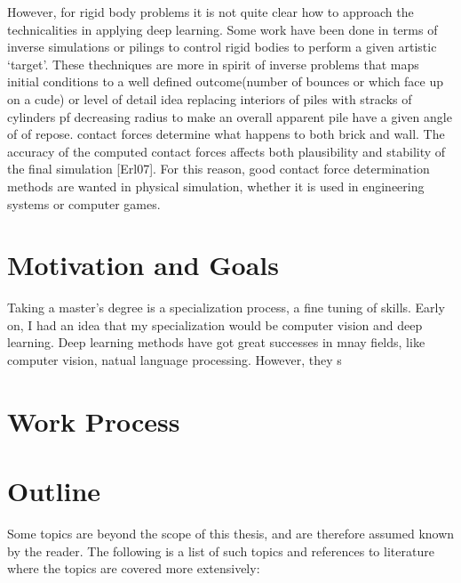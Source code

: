     However, for rigid body problems it is not quite clear how to approach the technicalities in applying deep learning. Some work have been done in terms of inverse simulations or pilings to control rigid bodies to perform a given artistic `target'. These thechniques are more in spirit of inverse problems that maps initial conditions to a well defined outcome(number of bounces or which face up on a cude) or level of detail idea replacing interiors of piles with stracks of cylinders pf decreasing radius to make an overall apparent pile have a given angle of of repose. contact forces determine what happens to both brick and wall. The accuracy of the computed contact forces affects both plausibility and stability of the final simulation [Erl07]. For this reason, good contact force determination methods are wanted in physical simulation, whether it is used in engineering systems or computer games.
\section{Motivation and Goals}
    Taking a master’s degree is a specialization process, a fine tuning of skills. Early on, I had an idea that my specialization would be computer vision and deep learning. Deep learning methods have got great successes in mnay fields, like computer vision, natual language processing. However, they s
\section{Work Process}
    

\section{Outline}
    Some topics are beyond the scope of this thesis, and are therefore assumed known by the reader. The following is a list of such topics and references to literature where the topics are covered more extensively: